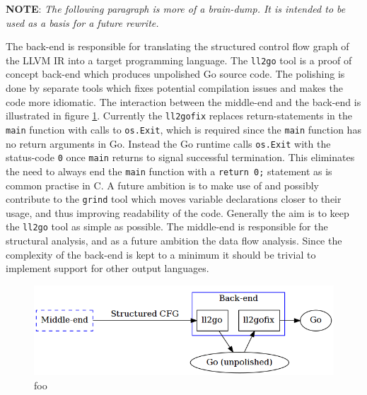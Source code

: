 

\textbf{NOTE}: \textit{The following paragraph is more of a brain-dump. It is intended to be used as a basis for a future rewrite.}

The back-end is responsible for translating the structured control flow graph of the LLVM IR into a target programming language. The \texttt{ll2go} tool is a proof of concept back-end which produces unpolished Go source code. The polishing is done by separate tools which fixes potential compilation issues and makes the code more idiomatic. The interaction between the middle-end and the back-end is illustrated in figure \ref{fig:back-end}. Currently the \texttt{ll2gofix} replaces return-statements in the \texttt{main} function with calls to \texttt{os.Exit}, which is required since the \texttt{main} function has no return arguments in Go. Instead the Go runtime calls \texttt{os.Exit} with the status-code \texttt{0} once \texttt{main} returns to signal successful termination. This eliminates the need to always end the \texttt{main} function with a \texttt{return 0;} statement as is common practise in C. A future ambition is to make use of and possibly contribute to the \texttt{grind} tool which moves variable declarations closer to their usage, and thus improving readability of the code. Generally the aim is to keep the \texttt{ll2go} tool as simple as possible. The middle-end is responsible for the structural analysis, and as a future ambition the data flow analysis. Since the complexity of the back-end is kept to a minimum it should be trivial to implement support for other output languages.

\begin{figure}[htbp]
	\begin{center}
		\includegraphics[width=\textwidth]{inc/back-end.png}
		\caption{foo}
		\label{fig:back-end}
	\end{center}
\end{figure}

